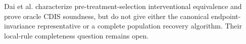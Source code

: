 Dai et al. characterize pre-treatment-selection interventional equivalence and prove oracle CDIS soundness, but do not give either the canonical endpoint-invariance representative or a complete population recovery algorithm.  Their local-rule completeness question remains open.